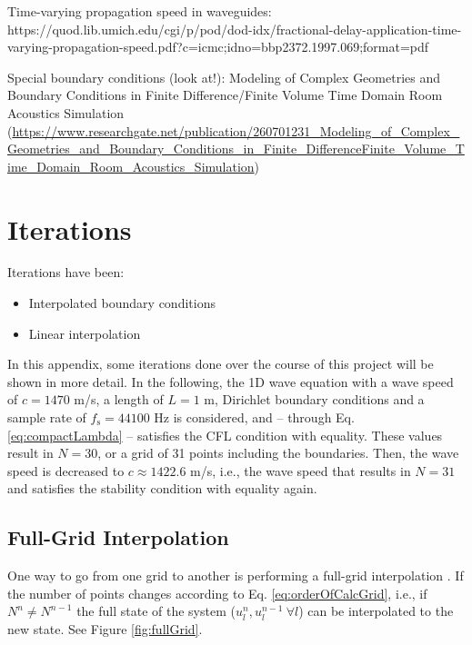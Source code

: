 Time-varying propagation speed in waveguides: https://quod.lib.umich.edu/cgi/p/pod/dod-idx/fractional-delay-application-time-varying-propagation-speed.pdf?c=icmc;idno=bbp2372.1997.069;format=pdf

Special boundary conditions (look at!):
Modeling of Complex Geometries and Boundary Conditions in Finite Difference/Finite Volume Time Domain Room Acoustics Simulation (\url{https://www.researchgate.net/publication/260701231_Modeling_of_Complex_Geometries_and_Boundary_Conditions_in_Finite_DifferenceFinite_Volume_Time_Domain_Room_Acoustics_Simulation})

\section{Iterations}
Iterations have been:
\begin{itemize}
    \item Interpolated boundary conditions
    \item Linear interpolation
\end{itemize}

 In this appendix, some iterations done over the course of this project will be shown in more detail. In the following, the 1D wave equation with a wave speed of $c = 1470$ m/s, a length of $L = 1$ m, Dirichlet boundary conditions and a sample rate of $f_\text{s} = 44100$ Hz is considered, and -- through Eq. \eqref{eq:compactLambda} -- satisfies the CFL condition with equality. These values result in $N = 30$, or a grid of 31 points including the boundaries. Then, the wave speed is decreased to $c \approx 1422.6$ m/s, i.e., the wave speed that results in $N=31$ and satisfies the stability condition with equality again. 

\subsection{Full-Grid Interpolation}
One way to go from one grid to another is performing a full-grid interpolation \cite[Chap. 5]{theBible}. If the number of points changes according to Eq. \eqref{eq:orderOfCalcGrid}, i.e., if $N^n \neq N^{n-1}$ the full state of the system ($u_l^n, u_l^{n-1}\ \forall l$)  can be interpolated to the new state. See Figure \ref{fig:fullGrid}. 

